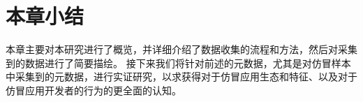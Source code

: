 \section{本章小结}

本章主要对本研究进行了概览，并详细介绍了数据收集的流程和方法，然后对采集到的数据进行了简要描绘。
接下来我们将针对前述的元数据，尤其是对仿冒样本中采集到的元数据，进行实证研究，以求获得对于仿冒应用生态和特征、以及对于仿冒应用开发者的行为的更全面的认知。

